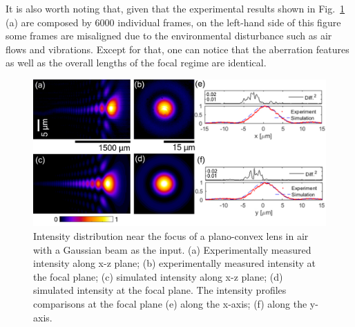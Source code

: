 \documentclass[9pt,twocolumn,twoside]{osajnl}
\begin{document}
It is also worth noting that, given that the experimental results shown in Fig.~\ref{fig:3} (a) are composed by 6000 individual frames, on the left-hand side of this figure some frames are misaligned due to the environmental disturbance such as air flows and vibrations.    
Except for that, one can notice that the aberration features as well as the overall lengths of the focal regime are identical.

\begin{figure}[t]
	\centering
	\includegraphics[width=\linewidth]{../AppOptics/figures/LA1951air.pdf}
	\caption{Intensity distribution near the focus of a plano-convex lens in air with a Gaussian beam as the input. (a) Experimentally measured intensity along x-z plane; (b) experimentally measured intensity at the focal plane; (c) simulated intensity along x-z plane; (d) simulated intensity at the focal plane. The intensity profiles comparisons at the focal plane (e) along the x-axis; (f) along the y-axis.}\label{fig:3}
\end{figure}
\end{document}
